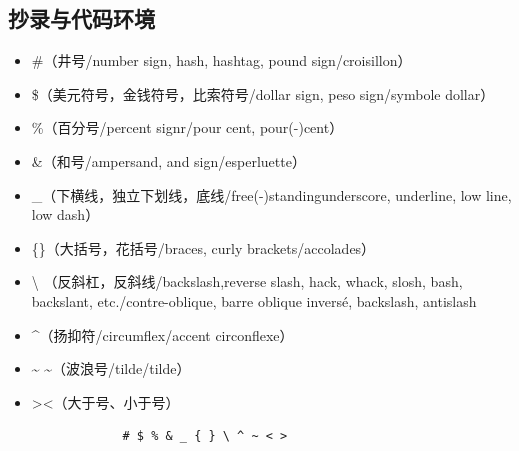 \documentclass{ctexart}
\begin{document}
    \subsection{抄录与代码环境}
            \begin{itemize}
                \item \#（井号/number sign, hash, hashtag, pound sign/croisillon）
                \item \$（美元符号，金钱符号，比索符号/dollar sign, peso sign/symbole dollar）
                \item \%（百分号/percent signr/pour cent, pour(-)cent）
                \item \&（和号/ampersand, and sign/esperluette）
                \item \_（下横线，独立下划线，底线/free(-)standingunderscore, underline, low line, low dash）
                \item \{\}（大括号，花括号/braces, curly brackets/accolades）
                \item \textbackslash \textrm{} {\rmfamily {}}（反斜杠，反斜线/backslash,reverse slash, hack, whack, slosh, bash, backslant, etc./contre-oblique, barre oblique inversé, backslash, antislash
                \item \^{}（扬抑符/circumflex/accent circonflexe）
                \item \~{} \textasciitilde（波浪号/tilde/tilde）
                \item \textgreater \textless（大于号、小于号）
            \end{itemize}
        

            \begin{verbatim}
                # $ % & _ { } \ ^ ~ < >
            \end{verbatim}
        
\end{document}
